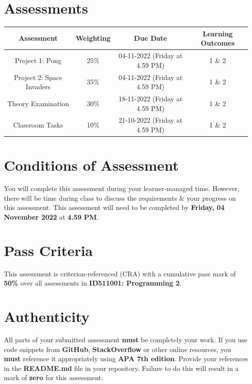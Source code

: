 \documentclass{article}
\begin{document}
\section*{Assessments}
\renewcommand{\arraystretch}{1.5}
\begin{tabular}{|c|c|c|c|}
    \hline
    \textbf{Assessment}                                 & \textbf{Weighting} & \textbf{Due Date}            & \textbf{Learning Outcomes} \\ \hline
    \small Project 1: Pong & \small 25\%        & \small 04-11-2022 (Friday at 4.59 PM)   & \small 1 \& 2                   \\ \hline
    \small Project 2: Space Invaders & \small 35\%        & \small 04-11-2022 (Friday at 4.59 PM)   & \small 1 \& 2                   \\ \hline
    \small Theory Examination                        & \small 30\%        & \small 18-11-2022 (Friday at 4.59 PM)  & \small 1 \& 2                   \\ \hline
    \small Classroom Tasks                       & \small 10\%        & \small 21-10-2022 (Friday at 4.59 PM)  & \small 1 \& 2                   \\ \hline
\end{tabular}

\section*{Conditions of Assessment}
You will complete this assessment during your learner-managed time. However, there will be time during class to discuss the requirements \& your progress on this assessment. This assessment will need to be completed by \textbf{Friday, 04 November 2022} at \textbf{4.59 PM}.

\section*{Pass Criteria}
This assessment is criterion-referenced (CRA) with a cumulative pass mark of \textbf{50\%} over all assessments in \textbf{ID511001: Programming 2}.

\section*{Authenticity}
All parts of your submitted assessment \textbf{must} be completely your work. If you use code snippets from \textbf{GitHub}, \textbf{StackOverflow} or other online resources, you \textbf{must} reference it appropriately using \textbf{APA 7th edition}. Provide your references in the \textbf{README.md} file in your repository. Failure to do this will result in a mark of \textbf{zero} for this assessment.
\end{document}
